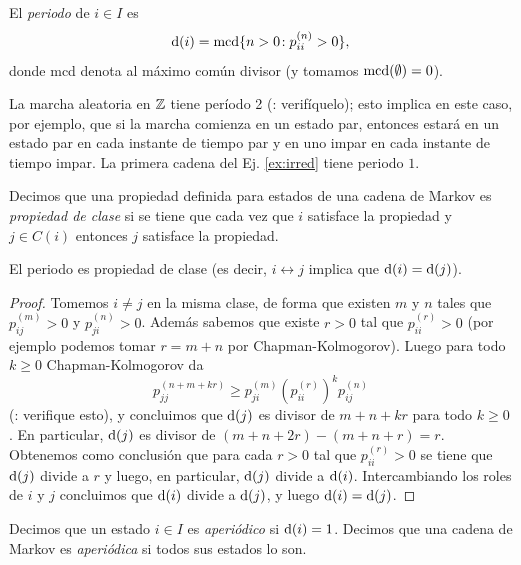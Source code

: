 \begin{defn}
El \emph{periodo} de $i\in I$ es
\[\mathrm{d}(i)=\text{\upshape{mcd}}\{n>0\!:p^{(n)}_{ii}>0\},\]
donde mcd denota al máximo común divisor (y tomamos $\text{\upshape{mcd}}(\emptyset)=0$).
\end{defn}

\begin{ex}\label{ex:periodo}
La marcha aleatoria en $\mathbb{Z}$ tiene período 2 (\uexers: verifíquelo); esto implica en este caso, por ejemplo, que si la marcha comienza en un estado par, entonces estará en un estado par en cada instante de tiempo par y en uno impar en cada instante de tiempo impar.
La primera cadena del Ej. \ref{ex:irred} tiene periodo $1$.
\end{ex}

\begin{defn}
Decimos que una propiedad definida para estados de una cadena de Markov es \emph{propiedad de clase} si se tiene que cada vez que $i$ satisface la propiedad y $j\in C(i)$ entonces $j$ satisface la propiedad.
\end{defn}

\begin{prop}\label{prop:periodo-clase}
El periodo es propiedad de clase (es decir, $i\leftrightarrow j$ implica que $\mathrm{d}(i)=\mathrm{d}(j)$).
\end{prop}

\begin{proof}
Tomemos $i\neq j$ en la misma clase, de forma que existen $m$ y $n$ tales que $p^{(m)}_{ij}>0$ y $p^{(n)}_{ji}>0$.
Además sabemos que existe $r>0$ tal que $p^{(r)}_{ii}>0$ (por ejemplo podemos tomar $r=m+n$ por Chapman-Kolmogorov).
Luego para todo $k\geq0$ Chapman-Kolmogorov da
\[p^{(n+m+kr)}_{jj}\geq p^{(m)}_{ji}(p^{(r)}_{ii})^kp^{(n)}_{ij}\]
(\uexers: verifique esto), y concluimos que $\mathrm{d}(j)$ es divisor de $m+n+kr$ para todo $k\geq0$.
En particular, $\mathrm{d}(j)$ es divisor de $(m+n+2r)-(m+n+r)=r$.
Obtenemos como conclusión que para cada $r>0$ tal que $p^{(r)}_{ii}>0$ se tiene que $\mathrm{d}(j)$ divide a $r$ y luego, en particular, $\mathrm{d}(j)$ divide a $\mathrm{d}(i)$.
Intercambiando los roles de $i$ y $j$ concluimos que $\mathrm{d}(i)$ divide a $\mathrm{d}(j)$, y luego $\mathrm{d}(i)=\mathrm{d}(j)$.
\end{proof}

\begin{defn}
Decimos que un estado $i\in I$ es \emph{aperiódico} si $\mathrm{d}(i)=1$.
Decimos que una cadena de Markov es \emph{aperiódica} si todos sus estados lo son.
\end{defn}

